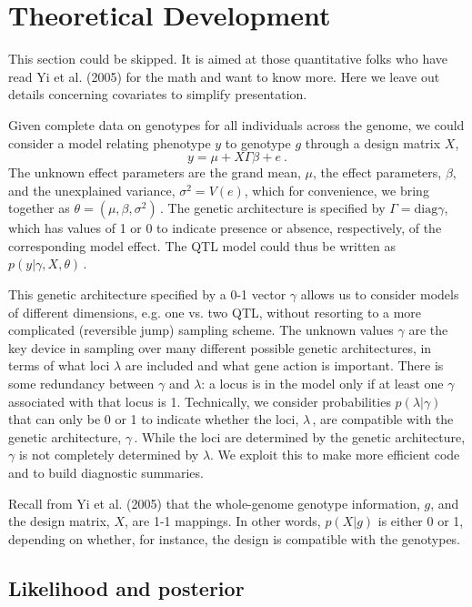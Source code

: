 \documentclass[12pt]{article}
\begin{document}
\section{Theoretical Development}

This section could be skipped. It is aimed at those quantitative folks
who have read Yi et al. (2005) for the math and want to know
more. Here we leave out details concerning covariates to simplify
presentation.

Given complete data on genotypes for all individuals across the
genome, we could consider a model relating phenotype $y$ to genotype
$g$ through a design matrix $X$,
$$
y = \mu + X\Gamma\beta + e~.
$$
The unknown effect parameters are the grand mean, $\mu$, the
effect parameters, $\beta$, and the unexplained variance, $\sigma^2 =
V(e)$, which for convenience, we bring together as 
$\theta = (\mu, \beta, \sigma^2)$\,.
The genetic architecture is specified by 
$\Gamma = \mbox{diag}\gamma$, which has values of 1 or 0 to indicate
presence or absence, respectively, of the corresponding model
effect. The QTL model could thus be written as 
$p(y\vert \gamma, X, \theta)\,$.

This genetic architecture specified by a 0-1 vector $\gamma$ allows us
to consider models of different dimensions, e.g. one vs. two QTL,
without resorting to a more complicated (reversible jump) sampling
scheme. The unknown values $\gamma$ are the key device in
sampling over many different possible genetic architectures, in terms
of what loci $\lambda$ are included and what gene action is
important. There is some redundancy between $\gamma$ and $\lambda$: a
locus is in the model only if at least one $\gamma$ associated with
that locus is 1. Technically, we consider probabilities 
$p(\lambda\vert\gamma)$
that can only be 0 or 1 to indicate whether the loci, $\lambda$\,, are
compatible with the genetic architecture, $\gamma$\,. While the loci
are determined by the genetic architecture, $\gamma$ is not completely
determined by $\lambda$. We exploit this to make more efficient code
and to build diagnostic summaries.

Recall from Yi et al. (2005) that the whole-genome genotype
information, $g$, and the design matrix, $X$, are 1-1 mappings. In
other words, $p(X\vert g)$ is either 0 or 1, depending on whether, for
instance, the design is compatible with the genotypes.

\subsection{Likelihood and posterior}
\end{document}

